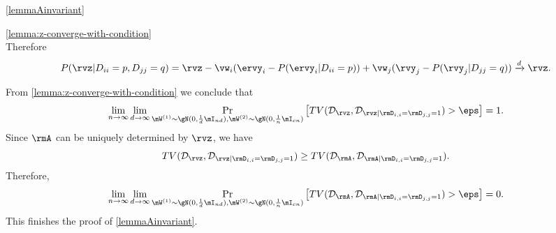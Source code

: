 \begin{proofof}{\cref{lemmaAinvariant}}
\begin{proofof}{\cref{lemma:z-converge-with-condition}}
\begin{equation}
\end{equation}
Therefore
\begin{equation}
    P(\rvz\vert D_{ii}=p,D_{jj}=q) = \rvz - \vw_i(\ervy_i - P(\ervy_i\vert D_{ii}=p)) + \vw_j(\rvy_j - P(\rvy_j\vert D_{jj}=q)) \xrightarrow{d} \rvz.
\end{equation}
\end{proofof}
From \cref{lemma:z-converge-with-condition} we conclude that
\begin{equation}
    \lim_{n\to\infty}\lim_{d\to \infty}\mathop{\Pr}_{\mW^{(1)}\sim\gN(0,\frac{1}{d}\mI_{nd}), \mW^{(2)}\sim\gN(0,\frac{1}{n}\mI_{cn})}\left[TV(\mathcal{D}_{\rvz},\mathcal{D}_{\rvz|\rmD_{i,i}=\rmD_{j,j}=1})>\eps\right] = 1.
\end{equation}
Since $\rmA$ can be uniquely determined by $\rvz$, we have
\begin{equation}
    TV(\mathcal{D}_{\rvz},\mathcal{D}_{\rvz|\rmD_{i,i}=\rmD_{j,j}=1}) \geq TV(\mathcal{D}_{\rmA},\mathcal{D}_{\rmA|\rmD_{i,i}=\rmD_{j,j}=1}).
\end{equation}
Therefore,
\begin{equation}
    \lim_{n\to\infty}\lim_{d\to \infty}\mathop{\Pr}_{\mW^{(1)}\sim\gN(0,\frac{1}{d}\mI_{nd}), \mW^{(2)}\sim\gN(0,\frac{1}{n}\mI_{cn})}\left[TV(\mathcal{D}_{\rmA},\mathcal{D}_{\rmA|\rmD_{i,i}=\rmD_{j,j}=1})>\eps\right] = 0.
\end{equation}
This finishes the proof of \cref{lemmaAinvariant}.
\end{proofof}

